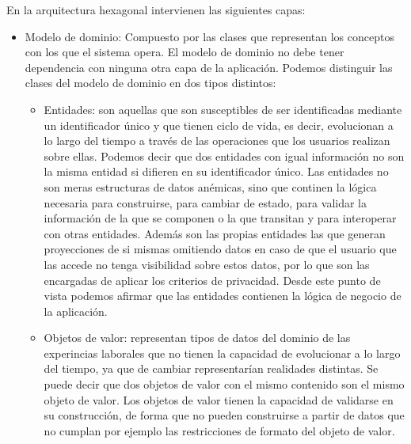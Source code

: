 \documentclass[a4paper, 12pt]{book}
\begin{document}
    En la arquitectura hexagonal intervienen las siguientes capas:

    \begin{itemize}
        \item Modelo de dominio: Compuesto por las clases que representan los conceptos con los que el sistema opera.
        El modelo de dominio no debe tener dependencia con ninguna otra capa de la aplicación.
        Podemos distinguir las clases del modelo de dominio en dos tipos distintos:

        \begin{itemize}
            \item Entidades: son aquellas que son susceptibles de ser identificadas mediante un identificador único y que tienen ciclo de vida, es decir, evolucionan a lo largo del tiempo a través de las operaciones que los usuarios realizan sobre ellas.
            Podemos decir que dos entidades con igual información no son la misma entidad si difieren en su identificador único.
            Las entidades no son meras estructuras de datos anémicas, sino que continen la lógica necesaria para construirse, para cambiar de estado, para validar la información de la que se componen o la que transitan y para interoperar con otras entidades.
            Además son las propias entidades las que generan proyecciones de si mismas omitiendo datos en caso de que el usuario que las accede no tenga visibilidad sobre estos datos, por lo que son las encargadas de aplicar los criterios de privacidad.
            Desde este punto de vista podemos afirmar que las entidades contienen la lógica de negocio de la aplicación.
            \item Objetos de valor: representan tipos de datos del dominio de las experincias laborales que no tienen la capacidad de evolucionar a lo largo del tiempo, ya que de cambiar representarían realidades distintas. Se puede decir que dos objetos de valor con el mismo contenido son el mismo objeto de valor.
            Los objetos de valor tienen la capacidad de validarse en su construcción, de forma que no pueden construirse a partir de datos que no cumplan por ejemplo las restricciones de formato del objeto de valor.
        \end{itemize}


\end{itemize}
\end{document}
